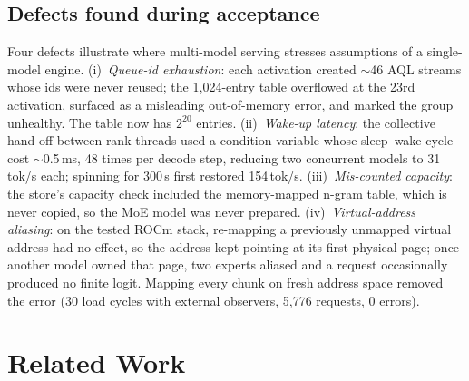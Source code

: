\documentclass[10pt,conference,a4paper]{IEEEtran}
\begin{document}
\subsection{Defects found during acceptance}\label{sec:lessons}

Four defects illustrate where multi-model serving stresses assumptions of a single-model engine.
(i)~\emph{Queue-id exhaustion}: each activation created $\sim$46 AQL streams whose ids were never
reused; the 1{,}024-entry table overflowed at the 23rd activation, surfaced as a misleading
out-of-memory error, and marked the group unhealthy. The table now has $2^{20}$ entries.
(ii)~\emph{Wake-up latency}: the collective hand-off between rank threads used a condition variable
whose sleep--wake cycle cost $\sim$0.5\,ms, 48 times per decode step, reducing two concurrent
models to 31\,tok/s each; spinning for 300\,\textmu s first restored 154\,tok/s.
(iii)~\emph{Mis-counted capacity}: the store's capacity check included the memory-mapped n-gram
table, which is never copied, so the MoE model was never prepared. (iv)~\emph{Virtual-address
aliasing}: on the tested ROCm stack, re-mapping a previously unmapped virtual address had no effect,
so the address kept pointing at its first physical page; once another model owned that page, two
experts aliased and a request occasionally produced no finite logit. Mapping every chunk on fresh
address space removed the error (30 load cycles with external observers, 5{,}776 requests,
0 errors).

\section{Related Work}\label{sec:related}
\end{document}
